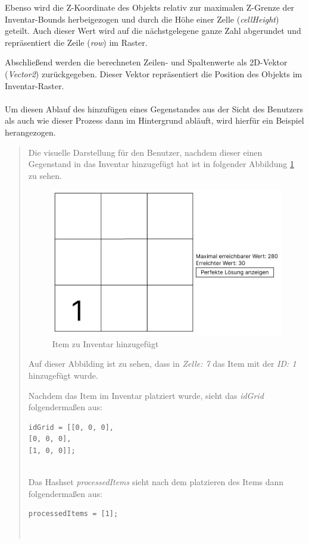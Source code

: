 Ebenso wird die Z-Koordinate des Objekts relativ zur maximalen Z-Grenze der Inventar-Bounds herbeigezogen und durch die
Höhe einer Zelle (\textit{cellHeight}) geteilt. Auch dieser Wert wird auf die nächstgelegene ganze Zahl abgerundet und
repräsentiert die Zeile (\textit{row}) im Raster.

Abschließend werden die berechneten Zeilen- und Spaltenwerte als 2D-Vektor (\textit{Vector2}) zurückgegeben. Dieser
Vektor repräsentiert die Position des Objekts im Inventar-Raster.\\
\\
Um diesen Ablauf des hinzufügen eines Gegenstandes aus der Sicht des Benutzers als auch wie dieser Prozess dann im
Hintergrund abläuft, wird hierfür ein Beispiel herangezogen.

\begin{quote}
Die visuelle Darstellung für den Benutzer, nachdem dieser einen Gegenstand in das Inventar hinzugefügt hat ist in folgender
Abbildung \ref{fig:controller_itemAdded} zu sehen.

\begin{figure}[H]
    \centering
    \includegraphics[scale=0.6]{images/itemAdded}
    \caption{Item zu Inventar hinzugefügt}
    \label{fig:controller_itemAdded}
\end{figure}

Auf dieser Abbilding ist zu sehen, dass in \textit{Zelle: 7} das Item mit der \textit{ID: 1} hinzugefügt wurde.

Nachdem das Item im Inventar platziert wurde, sieht das \textit{idGrid} folgendermaßen aus:
\begin{lstlisting}[style=csharp label=code:controller_savedID]
idGrid = [[0, 0, 0],
[0, 0, 0],
[1, 0, 0]];
\end{lstlisting}\\

Das Hashset \textit{processedItems} sieht nach dem platzieren des Items dann folgendermaßen aus:
\begin{lstlisting}[style=csharp label=code:controller_savedID]
processedItems = [1];
\end{lstlisting}\\
\end{quote}
